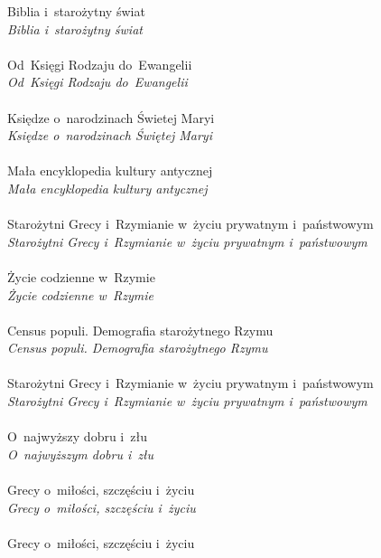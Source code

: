 \documentclass[a4paper,11pt]{article}
\numberwithin{equation}{section}
\begin{document}
\Jest Biblia i~starożytny świat \\
\PowinnoByc \textit{Biblia i~starożytny świat} \\
 \\
\Jest Od~Księgi Rodzaju do~Ewangelii \\
\PowinnoByc \textit{Od~Księgi Rodzaju do~Ewangelii} \\
 \\
\Jest  Księdze o~narodzinach Świetej Maryi \\
\PowinnoByc \textit{Księdze o~narodzinach Świętej Maryi} \\
 \\
\Jest Mała encyklopedia kultury antycznej \\
\PowinnoByc \textit{Mała encyklopedia kultury antycznej} \\
 \\
\Jest Starożytni Grecy i~Rzymianie w~życiu prywatnym i~państwowym \\
\PowinnoByc \textit{Starożytni Grecy i~Rzymianie w~życiu prywatnym
  i~państwowym} \\
 \\
\Jest Życie codzienne w~Rzymie \\
\PowinnoByc \textit{Życie codzienne w~Rzymie} \\
 \\
\Jest Census populi. Demografia starożytnego Rzymu \\
\PowinnoByc \textit{Census populi. Demografia starożytnego Rzymu} \\
 \\
\Jest Starożytni Grecy i~Rzymianie w~życiu prywatnym i~państwowym \\
\PowinnoByc \textit{Starożytni Grecy i~Rzymianie w~życiu prywatnym
  i~państwowym} \\
 \\
\Jest O~najwyższy dobru i~złu \\
\PowinnoByc \textit{O~najwyższym dobru i~złu} \\
 \\
\Jest Grecy o~miłości, szczęściu i~życiu \\
\PowinnoByc \textit{Grecy o~miłości, szczęściu i~życiu} \\
 \\
\Jest Grecy o~miłości, szczęściu i~życiu \\
\end{document}
